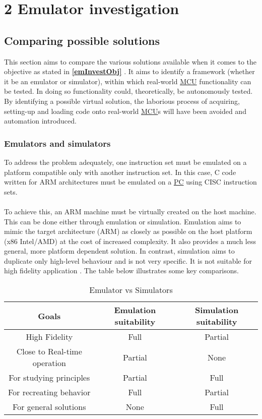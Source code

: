 

\chapter*{2 Emulator investigation}
\setcounter{chapter}{2}
\setcounter{section}{0}
\setcounter{figure}{0}
\setcounter{table}{0}
\label{2emul}


\section{Comparing possible solutions}
\label{CompSolu}
This section aims to compare the various solutions available when it comes to the objective as stated in \textbf{\ref{emInvestObj} }. It aims to identify a framework (whether it be an emulator or simulator), within which real-world \hyperref[listAbr]{MCU} functionality can be tested. In doing so functionality could, theoretically, be autonomously tested. By identifying a possible virtual solution, the laborious process of acquiring, setting-up and loading code onto real-world \hyperref[listAbr]{MCU}s will have been avoided and automation introduced.   
\subsection{Emulators and simulators}
\label{emuVsSim}
To address the problem adequately, one instruction set must be emulated on a platform compatible only with another instruction set. In this case, C code written for ARM architectures must be emulated on a \hyperref[listAbr]{PC} using CISC instruction sets.
\\\\
To achieve this, an ARM machine must be virtually created on the host machine. This can be done either through emulation or simulation. Emulation aims to mimic the target architecture (ARM) as closely as possible on the host platform (x86 Intel/AMD) at the cost of increased complexity. It also provides a much less general, more platform dependent solution. In contrast, simulation aims to duplicate only high-level behaviour and is not very specific. It is not suitable for high fidelity application \cite{Chris}. The table below illustrates some key comparisons.

\begin{table}[H]
\begin{tabular}{ |c|c|c| } 
 \hline
 Goals & Emulation suitability & Simulation suitability \\ 
 \hline
 High Fidelity & Full & Partial \\ 
 Close to Real-time operation& Partial & None \\ 
 For studying principles & Partial & Full\\ 
 For recreating behavior & Full & Partial\\ 
 For general solutions & None & Full\\ 
 \hline
\end{tabular}
\caption{Emulator vs Simulators}
\label{emVsim}
\end{table}

